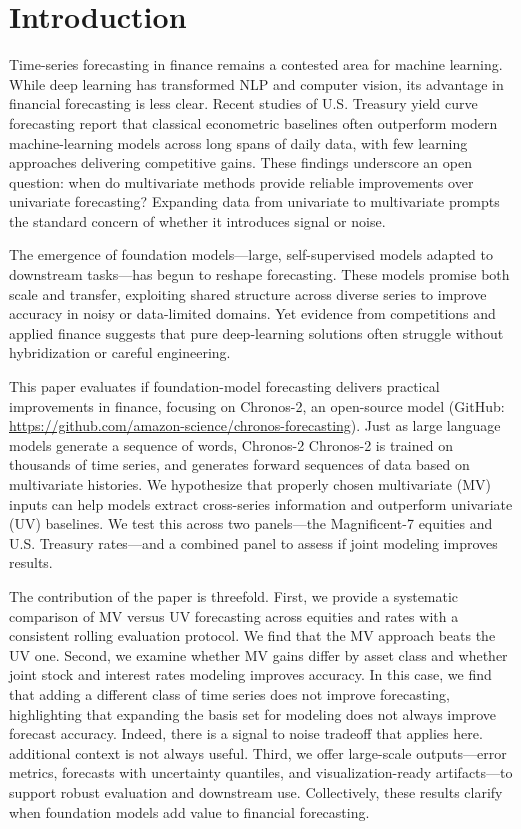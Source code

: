 \documentclass[twocolumn]{article}
\begin{document}
\section{Introduction}

Time-series forecasting in finance remains a contested area for machine learning. While deep learning has transformed NLP and computer vision, its advantage in financial forecasting is less clear. Recent studies of U.S. Treasury yield curve forecasting report that classical econometric baselines often outperform modern machine-learning models across long spans of daily data, with few learning approaches delivering competitive gains. These findings underscore an open question: when do multivariate methods provide reliable improvements over univariate forecasting? Expanding data from univariate to multivariate prompts the standard concern of whether it introduces signal or noise.

The emergence of foundation models—large, self-supervised models adapted to downstream tasks—has begun to reshape forecasting. These models promise both scale and transfer, exploiting shared structure across diverse series to improve accuracy in noisy or data-limited domains. Yet evidence from competitions and applied finance \citep{singh_yield_2025} suggests that pure deep-learning solutions often struggle without hybridization or careful engineering.

This paper evaluates if foundation-model forecasting delivers practical improvements in finance, focusing on Chronos-2, an open-source model (GitHub: \url{https://github.com/amazon-science/chronos-forecasting}). Just as large language models generate a sequence of words, Chronos-2 Chronos-2 is trained on thousands of time series, and generates forward sequences of data based on multivariate histories. We hypothesize that properly chosen multivariate (MV) inputs can help models extract cross-series information and outperform univariate (UV) baselines. We test this across two panels—the Magnificent-7 equities and U.S. Treasury rates—and a combined panel to assess if joint modeling improves results.

The contribution of the paper is threefold. First, we provide a systematic comparison of MV versus UV forecasting across equities and rates with a consistent rolling evaluation protocol. We find that the MV approach beats the UV one. Second, we examine whether MV gains differ by asset class and whether joint stock and interest rates modeling improves accuracy. In this case, we find that adding a different class of time series does not improve forecasting, highlighting that expanding the basis set for modeling does not always improve forecast accuracy. Indeed, there is a signal to noise tradeoff that applies here. additional context is not always useful. Third, we offer large-scale outputs---error metrics, forecasts with uncertainty quantiles, and visualization-ready artifacts---to support robust evaluation and downstream use. Collectively, these results clarify when foundation models add value to financial forecasting.
\end{document}
